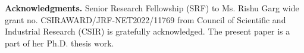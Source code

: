 \documentclass[12pt,reqno]{amsart}%
\begin{document}
\textbf{\large Acknowledgments.}
Senior Research Fellowship (SRF) to Ms. Rishu Garg wide grant no. CSIRAWARD/JRF-NET2022/11769
 from Council of Scientific and Industrial Research (CSIR) is gratefully acknowledged. The present paper is a part of her Ph.D. thesis work.

\end{document}

